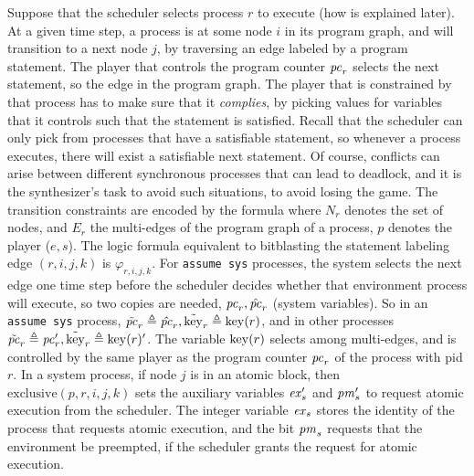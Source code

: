 \documentclass[copyright]{eptcs}
\begin{document}
Suppose that the scheduler selects process $r$ to execute (how is explained later).
At a given time step, a process is at some node $i$ in its program graph, and will transition to a next node $j$, by traversing an edge labeled by a program statement.
The player that controls the program counter $\mathit{pc}_r$ selects the next statement, so the edge in the program graph.
The player that is constrained by that process has to make sure that it {\em complies}, by picking values for variables that it controls such that the statement is satisfied.
Recall that the scheduler can only pick from processes that have a satisfiable statement, so whenever a process executes, there will exist a satisfiable next statement.
Of course, conflicts can arise between different synchronous processes that can lead to deadlock, and it is the synthesizer's task to avoid such situations, to avoid losing the game.
The transition constraints are encoded by the formula
where $N_r$ denotes the set of nodes, and $E_r$ the multi-edges of the program graph of a process, $p$ denotes the player ($e, s$).
The logic formula equivalent to bitblasting the statement labeling edge $(r, i, j, k)$ is $\varphi_{r, i, j, k}$.
For \texttt{assume sys} processes, the system selects the next edge one time step before the scheduler decides whether that environment process will execute, so two copies are needed, $\mathit{pc}_r, \hat{\mathit{pc}}_r$ (system variables).
So in an \texttt{assume sys} process,
$\tilde{\mathit{pc}}_r \triangleq \hat{\mathit{pc}}_r,
\tilde{\mathrm{key}}_r \triangleq \mathrm{key}(r)$, and in other processes
$\tilde{\mathit{pc}}_r \triangleq \mathit{pc}_r',
\tilde{\mathrm{key}}_r \triangleq \mathrm{key}(r)'$.
The variable $\mathrm{key}(r)$ selects among multi-edges, and is controlled by the same player as the program counter $\mathit{pc}_r$ of the process with pid $r$.
In a system process, if node $j$ is in an atomic block, then $\mathrm{exclusive}(p, r, i, j, k)$ sets the auxiliary variables $\mathit{ex}_s'$ and $\mathit{pm}_s'$ to request atomic execution from the scheduler.
The integer variable $\mathit{ex}_s$ stores the identity of the process that requests atomic execution, and the bit $\mathit{pm}_s$ requests that the environment be preempted, if the scheduler grants the request for atomic execution.
\end{document}
